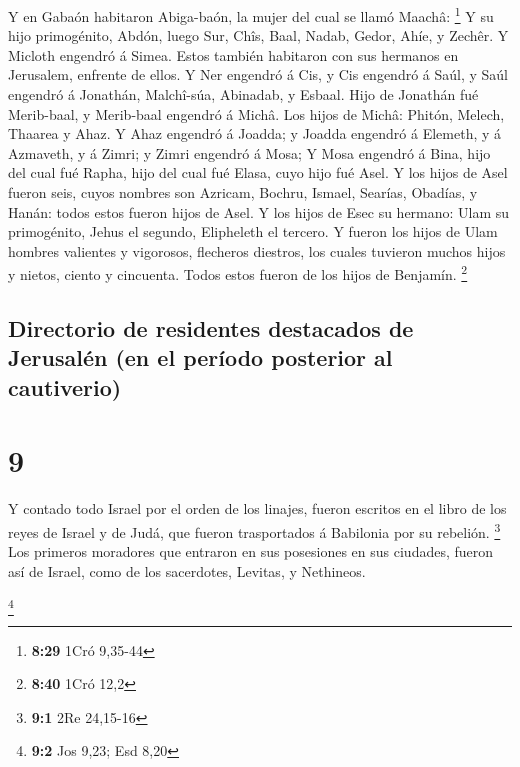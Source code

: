  Y en Gabaón habitaron Abiga-baón, la mujer del cual se
llamó Maachâ: \footnote{\textbf{8:29} 1Cró 9,35-44}  Y su
hijo primogénito, Abdón, luego Sur, Chîs, Baal, Nadab, 
Gedor, Ahíe, y Zechêr.  Y Micloth engendró á Simea. Estos
también habitaron con sus hermanos en Jerusalem, enfrente de ellos.
 Y Ner engendró á Cis, y Cis engendró á Saúl, y Saúl
engendró á Jonathán, Malchî-súa, Abinadab, y Esbaal. 
Hijo de Jonathán fué Merib-baal, y Merib-baal engendró á Michâ.
 Los hijos de Michâ: Phitón, Melech, Thaarea y Ahaz.
 Y Ahaz engendró á Joadda; y Joadda engendró á Elemeth, y
á Azmaveth, y á Zimri; y Zimri engendró á Mosa;  Y Mosa
engendró á Bina, hijo del cual fué Rapha, hijo del cual fué Elasa, cuyo
hijo fué Asel.  Y los hijos de Asel fueron seis, cuyos
nombres son Azricam, Bochru, Ismael, Searías, Obadías, y Hanán: todos
estos fueron hijos de Asel.  Y los hijos de Esec su
hermano: Ulam su primogénito, Jehus el segundo, Elipheleth el tercero.
 Y fueron los hijos de Ulam hombres valientes y
vigorosos, flecheros diestros, los cuales tuvieron muchos hijos y
nietos, ciento y cincuenta. Todos estos fueron de los hijos de Benjamín.
\footnote{\textbf{8:40} 1Cró 12,2}

\hypertarget{directorio-de-residentes-destacados-de-jerusaluxe9n-en-el-peruxedodo-posterior-al-cautiverio}{%
\subsection{Directorio de residentes destacados de Jerusalén (en el
período posterior al
cautiverio)}\label{directorio-de-residentes-destacados-de-jerusaluxe9n-en-el-peruxedodo-posterior-al-cautiverio}}

\hypertarget{section-8}{%
\section{9}\label{section-8}}

 Y contado todo Israel por el orden de los linajes, fueron
escritos en el libro de los reyes de Israel y de Judá, que fueron
trasportados á Babilonia por su rebelión. \footnote{\textbf{9:1} 2Re
  24,15-16}  Los primeros moradores que entraron en sus
posesiones en sus ciudades, fueron así de Israel, como de los
sacerdotes, Levitas, y Nethineos.

\footnote{\textbf{9:2} Jos 9,23; Esd 8,20}

